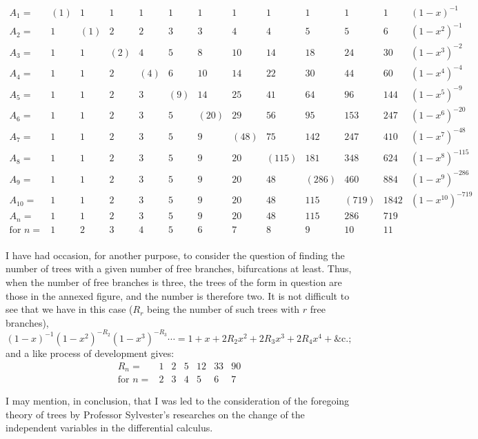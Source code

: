 \documentclass[12pt,a4paper]{article}
\theoremstyle{definition}
\begin{document}
\[
\begin{array}{c|*{11}{c}|c}
A_1 = & (1) & 1 & 1 & 1 & 1 & 1 & 1 & 1 & 1 & 1 & 1 & (1-x)^{-1}\\
A_2 = & 1 & (1) & 2 & 2 & 3 & 3 & 4 & 4 & 5 & 5 & 6 & (1-x^2)^{-1}\\
A_3 = & 1 & 1 & (2) & 4 & 5 & 8 & 10 & 14 & 18 & 24 & 30 & (1-x^3)^{-2}\\
A_4 = & 1 & 1 & 2 & (4) & 6 & 10 & 14 & 22 & 30 & 44 & 60 & (1-x^4)^{-4}\\
A_5 = & 1 & 1 & 2 & 3 & (9) & 14 & 25 & 41 & 64 & 96 & 144 & (1-x^5)^{-9}\\
A_6 = & 1 & 1 & 2 & 3 & 5 & (20) & 29 & 56 & 95 & 153 & 247 & (1-x^6)^{-20}\\
A_7 = & 1 & 1 & 2 & 3 & 5 & 9 & (48) & 75 & 142 & 247 & 410 & (1-x^7)^{-48}\\
A_8 = & 1 & 1 & 2 & 3 & 5 & 9 & 20 & (115) & 181 & 348 & 624 & (1-x^8)^{-115}\\
A_9 = & 1 & 1 & 2 & 3 & 5 & 9 & 20 & 48 & (286) & 460 & 884 & (1-x^9)^{-286}\\
A_{10} = & 1 & 1 & 2 & 3 & 5 & 9 & 20 & 48 & 115 & (719) & 1842 & (1-x^{10})^{-719}\\
\hline
A_n = & 1 & 1 & 2 & 3 & 5 & 9 & 20 & 48 & 115 & 286 & 719 & \\
\text{for } n = & 1 & 2 & 3 & 4 & 5 & 6 & 7 & 8 & 9 & 10 & 11 & \\
\end{array}
\]

I have had occasion, for another purpose, to consider the question of finding the
number of trees with a given number of free branches, bifurcations at least. Thus,
when the number of free branches is three, the trees of the form in question are
those in the annexed figure, and the number is therefore two. It is not difficult to
see that we have in this case ($R_r$ being the number of such trees with $r$ free branches),
\[
(1 - x)^{-1}(1 - x^2)^{-R_2}(1 - x^3)^{-R_3}\cdots = 1 + x + 2R_2 x^2 + 2R_3 x^3 + 2R_4 x^4 + \&\textrm{c.};
\]
and a like process of development gives:
\[
\begin{array}{c|cccccc}
R_n = & 1 & 2 & 5 & 12 & 33 & 90\\
\text{for } n = & 2 & 3 & 4 & 5 & 6 & 7
\end{array}
\]

I may mention, in conclusion, that I was led to the consideration of the foregoing
theory of trees by Professor Sylvester's researches on the change of the independent
variables in the differential calculus.
\end{document}
